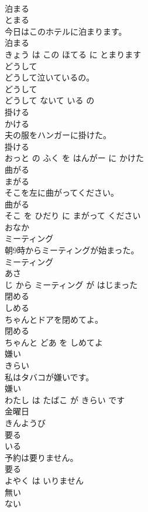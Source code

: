 \documentclass[8pt]{extreport}
\begin{document}
\begin{CJK}{UTF8}{min}
\\	泊まる	
\\	とまる			
\\	今日はこのホテルに泊まります。	
\\	泊まる 
\\	きょう は この ほてる に とまります			
\\	どうして	
\\	どうして泣いているの。	
\\	どうして 
\\	どうして ないて いる の			
\\	掛ける	
\\	かける			
\\	夫の服をハンガーに掛けた。	
\\	掛ける 
\\	おっと の ふく を はんがー に かけた			
\\	曲がる	
\\	まがる			
\\	そこを左に曲がってください。	
\\	曲がる 
\\	そこ を ひだり に まがって ください			
\\	おなか	
\\	ミーティング	
\\	朝9時からミーティングが始まった。	
\\	ミーティング 
\\	あさ 
\\	じ から ミーティング が はじまった			
\\	閉める	
\\	しめる			
\\	ちゃんとドアを閉めてよ。	
\\	閉める 
\\	ちゃんと どあ を しめてよ			
\\	嫌い	
\\	きらい			
\\	私はタバコが嫌いです。	
\\	嫌い 
\\	わたし は たばこ が きらい です			
\\	金曜日	
\\	きんようび			
\\	要る	
\\	いる			
\\	予約は要りません。	
\\	要る 
\\	よやく は いりません			
\\	無い	
\\	ない			

\end{CJK}
\end{document}
